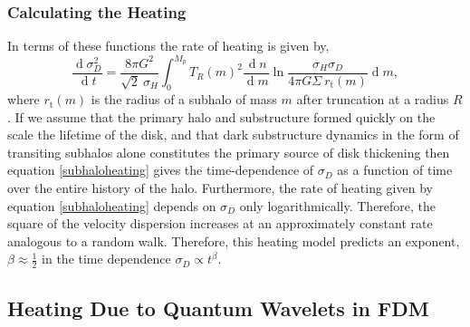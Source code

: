 \documentclass[usenatbib]{mnras}
\renewcommand{\d}[1]{\! \mathrm{d}#1 \:}
\newcommand{\deriv}[2]{\frac{\d{#1}}{\d{#2}}}
\renewcommand{\d}[1]{\ensuremath{\operatorname{d}\!{#1}}}
\begin{document}
\subsubsection{Calculating the Heating}

In terms of these functions the rate of heating is given by,
\begin{equation} \label{subhaloheating}
\deriv{\sigma_D^2}{t} = \frac{8 \pi G^2}{\sqrt{2} \: \sigma_H} \int_0^{M_p} T_R(m)^2  \deriv{n}{m}  \ln{\frac{\sigma_H \sigma_D}{4 \pi G \Sigma \: r_{\text{t}}(m)}} \d{m},
\end{equation}   
where $r_{\text{t}}(m)$ is the radius of a subhalo of mass $m$ after truncation at a radius $R$. 
If we assume that the primary halo and substructure formed quickly on the scale the lifetime of the disk, and that dark substructure dynamics in the form of transiting subhalos alone constitutes the primary source of disk thickening then equation \eqref{subhaloheating} gives the time-dependence of $\sigma_D$ as a function of time over the entire history of the halo. Furthermore, the rate of heating given by equation \eqref{subhaloheating} depends on $\sigma_D$ only logarithmically. Therefore, the square of the velocity dispersion increases at an approximately constant rate analogous to a random walk. Therefore, this heating model predicts an exponent, $\beta \approx \tfrac{1}{2}$ in the time dependence $\sigma_D \propto t^{\beta}$.

\subsection{Heating Due to Quantum Wavelets in FDM}
\end{document}
